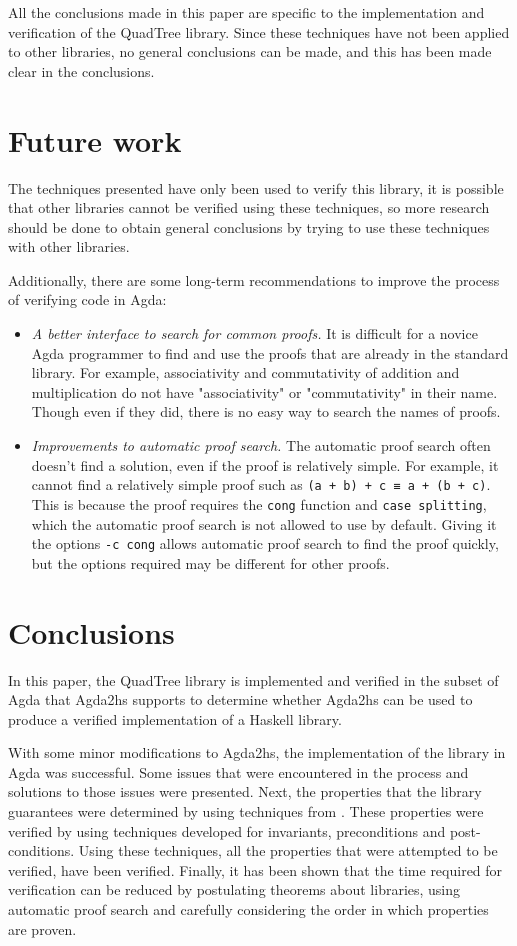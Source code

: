 All the conclusions made in this paper are specific to the implementation and verification of the QuadTree library. Since these techniques have not been applied to other libraries, no general conclusions can be made, and this has been made clear in the conclusions.

\section{Future work}
The techniques presented have only been used to verify this library, it is possible that other libraries cannot be verified using these techniques, so more research should be done to obtain general conclusions by trying to use these techniques with other libraries. 

Additionally, there are some long-term recommendations to improve the process of verifying code in Agda:
\begin{itemize}
	\item \textit{A better interface to search for common proofs.} It is difficult for a novice Agda programmer to find and use the proofs that are already in the standard library. For example, associativity and commutativity of addition and multiplication do not have "associativity" or "commutativity" in their name. Though even if they did, there is no easy way to search the names of proofs.
	\item \textit{Improvements to automatic proof search.} The automatic proof search often doesn't find a solution, even if the proof is relatively simple. For example, it cannot find a relatively simple proof such as \verb|(a + b) + c ≡ a + (b + c)|. This is because the proof requires the \verb|cong| function and \verb|case splitting|, which the automatic proof search is not allowed to use by default. Giving it the options \verb|-c cong| allows automatic proof search to find the proof quickly, but the options required may be different for other proofs.
\end{itemize}

\section{Conclusions}
In this paper, the QuadTree library is implemented and verified in the subset of Agda that Agda2hs supports to determine whether Agda2hs can be used to produce a verified implementation of a Haskell library. 

With some minor modifications to Agda2hs, the implementation of the library in Agda was successful. Some issues that were encountered in the process and solutions to those issues were presented. Next, the properties that the library guarantees were determined by using techniques from \cite{BREITNER2021}. These properties were verified by using techniques developed for invariants, preconditions and post-conditions.  Using these techniques, all the properties that were attempted to be verified, have been verified. Finally, it has been shown that the time required for verification can be reduced by postulating theorems about libraries, using automatic proof search and carefully considering the order in which properties are proven.


